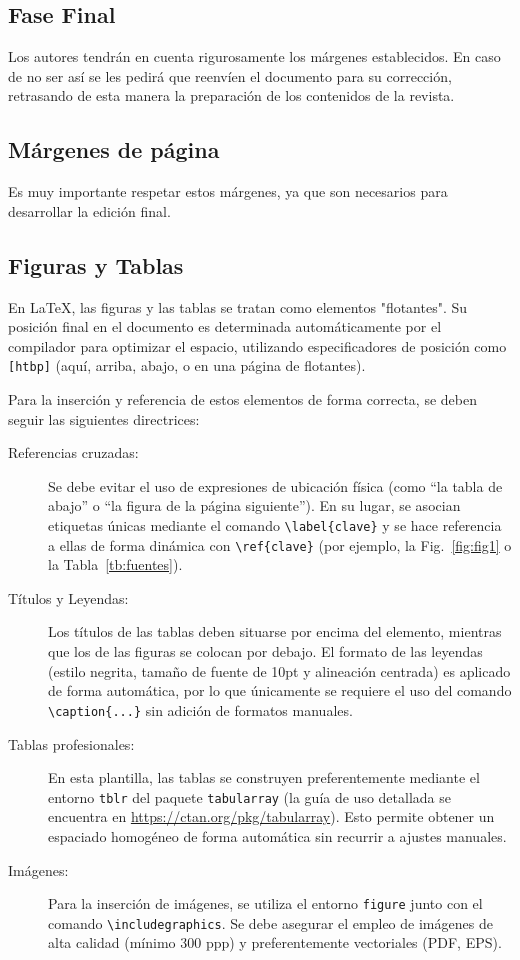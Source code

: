 \documentclass[a4paper, 12pt]{article}
\begin{document}
\subsection{Fase Final}

Los autores tendrán en cuenta rigurosamente los márgenes establecidos. En caso de no ser así se les pedirá que reenvíen el documento para su corrección, retrasando de esta manera la preparación de los contenidos de la revista.

\subsection{Márgenes de página}

Es muy importante respetar estos márgenes, ya que son necesarios para desarrollar la edición final.

\subsection{Figuras y Tablas}

En \LaTeX{}, las figuras y las tablas se tratan como elementos "flotantes". Su posición final en el documento es determinada automáticamente por el compilador para optimizar el espacio, utilizando especificadores de posición como \texttt{[htbp]} (aquí, arriba, abajo, o en una página de flotantes).

Para la inserción y referencia de estos elementos de forma correcta, se deben seguir las siguientes directrices:
\begin{description}
  \item[Referencias cruzadas:] Se debe evitar el uso de expresiones de ubicación física (como “la tabla de abajo” o “la figura de la página siguiente”). En su lugar, se asocian etiquetas únicas mediante el comando \texttt{\textbackslash label\allowbreak \{clave\}} y se hace referencia a ellas de forma dinámica con \texttt{\textbackslash ref\allowbreak \{clave\}} (por ejemplo, la Fig.~\ref{fig:fig1} o la Tabla~\ref{tb:fuentes}).
  \item[Títulos y Leyendas:] Los títulos de las tablas deben situarse por encima del elemento, mientras que los de las figuras se colocan por debajo. El formato de las leyendas (estilo negrita, tamaño de fuente de 10pt y alineación centrada) es aplicado de forma automática, por lo que únicamente se requiere el uso del comando \texttt{\textbackslash caption\allowbreak \{...\}} sin adición de formatos manuales.
  \item[Tablas profesionales:] En esta plantilla, las tablas se construyen preferentemente mediante el entorno \texttt{tblr} del paquete \texttt{tabularray} (la guía de uso detallada se encuentra en \url{https://ctan.org/pkg/tabularray}). Esto permite obtener un espaciado homogéneo de forma automática sin recurrir a ajustes manuales.
  \item[Imágenes:] Para la inserción de imágenes, se utiliza el entorno \texttt{figure} junto con el comando \texttt{\textbackslash includegraphics\allowbreak [width=...]}. Se debe asegurar el empleo de imágenes de alta calidad (mínimo 300 ppp) y preferentemente vectoriales (PDF, EPS).
\end{description}
\end{document}
